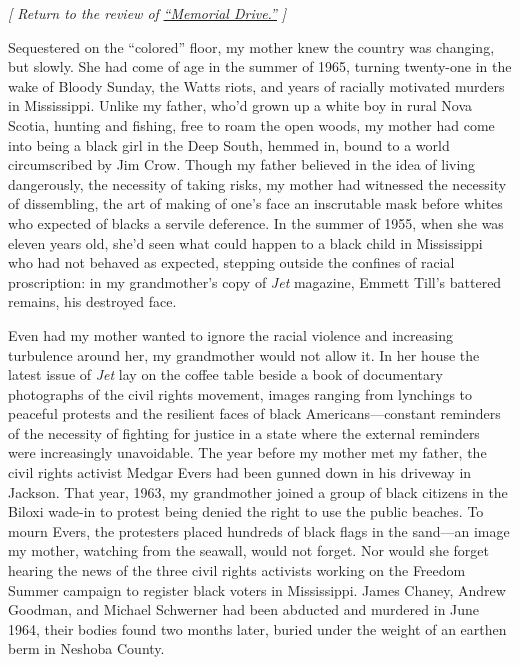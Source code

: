 \emph{{[} Return to the review of}
\href{https://www.nytimes3xbfgragh.onion/2020/07/30/books/review/memorial-drive-natastha-trethewey.html}{\emph{``Memorial
Drive.''}} \emph{{]}}

Sequestered on the ``colored'' floor, my mother knew the country was
changing, but slowly. She had come of age in the summer of 1965, turning
twenty-one in the wake of Bloody Sunday, the Watts riots, and years of
racially motivated murders in Mississippi. Unlike my father, who'd grown
up a white boy in rural Nova Scotia, hunting and fishing, free to roam
the open woods, my mother had come into being a black girl in the Deep
South, hemmed in, bound to a world circumscribed by Jim Crow. Though my
father believed in the idea of living dangerously, the necessity of
taking risks, my mother had witnessed the necessity of dissembling, the
art of making of one's face an inscrutable mask before whites who
expected of blacks a servile deference. In the summer of 1955, when she
was eleven years old, she'd seen what could happen to a black child in
Mississippi who had not behaved as expected, stepping outside the
confines of racial proscription: in my grandmother's copy of \emph{Jet}
magazine, Emmett Till's battered remains, his destroyed face.

Even had my mother wanted to ignore the racial violence and increasing
turbulence around her, my grandmother would not allow it. In her house
the latest issue of \emph{Jet} lay on the coffee table beside a book of
documentary photographs of the civil rights movement, images ranging
from lynchings to peaceful protests and the resilient faces of black
Americans---constant reminders of the necessity of fighting for justice
in a state where the external reminders were increasingly unavoidable.
The year before my mother met my father, the civil rights activist
Medgar Evers had been gunned down in his driveway in Jackson. That year,
1963, my grandmother joined a group of black citizens in the Biloxi
wade-in to protest being denied the right to use the public beaches. To
mourn Evers, the protesters placed hundreds of black flags in the
sand---an image my mother, watching from the seawall, would not forget.
Nor would she forget hearing the news of the three civil rights
activists working on the Freedom Summer campaign to register black
voters in Mississippi. James Chaney, Andrew Goodman, and Michael
Schwerner had been abducted and murdered in June 1964, their bodies
found two months later, buried under the weight of an earthen berm in
Neshoba County.

